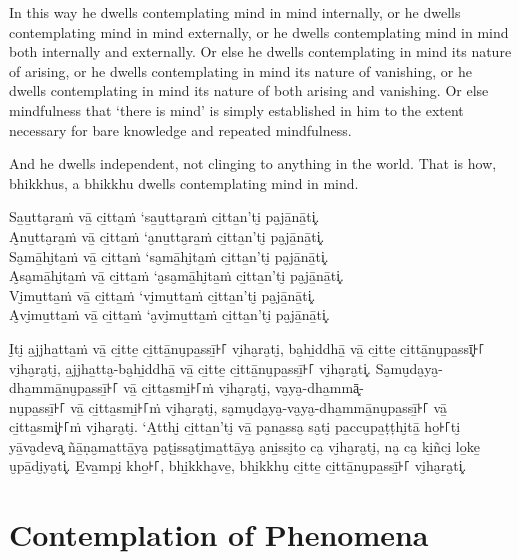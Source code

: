 In this way he dwells contemplating mind in mind internally, or he dwells
contemplating mind in mind externally, or he dwells contemplating mind in mind
both internally and externally. Or else he dwells contemplating in mind its
nature of arising, or he dwells contemplating in mind its nature of vanishing,
or he dwells contemplating in mind its nature of both arising and vanishing. Or
else mindfulness that ‘there is mind’ is simply established in him to the extent
necessary for bare knowledge and repeated mindfulness.

And he dwells independent, not clinging to anything in the world. That is how,
bhikkhus, a bhikkhu dwells contemplating mind in mind.


\paliPage

Sa̱u̱tta̮ra̱ṁ vā̱ ci̱tta̱ṁ ‘sa̱u̱tta̮ra̱ṁ ci̱tta̱n’ti̮ pa̮jā̱nā̱ti͓.\\
A̮nu̱tta̮ra̱ṁ vā̱ ci̱tta̱ṁ ‘a̮nu̱tta̮ra̱ṁ ci̱tta̱n’ti̮ pa̮jā̱nā̱ti͓.\\
Sa̮mā̱hi̮ta̱ṁ vā̱ ci̱tta̱ṁ ‘sa̮mā̱hi̮ta̱ṁ ci̱tta̱n’ti̮ pa̮jā̱nā̱ti͓.\\
A̮sa̮mā̱hi̮ta̱ṁ vā̱ ci̱tta̱ṁ ‘a̮sa̮mā̱hi̮ta̱ṁ ci̱tta̱n’ti̮ pa̮jā̱nā̱ti͓.\\
Vi̮mu̱tta̱ṁ vā̱ ci̱tta̱ṁ ‘vi̮mu̱tta̱ṁ ci̱tta̱n’ti̮ pa̮jā̱nā̱ti͓.\\
A̮vi̮mu̱tta̱ṁ vā̱ ci̱tta̱ṁ ‘a̮vi̮mu̱tta̱ṁ ci̱tta̱n’ti̮ pa̮jā̱nā̱ti͓.

I̮ti̮ a̱jjha̱tta̱ṁ vā̱ ci̱tte̱ ci̱ttā̱nu̮pa̱ssī̱꜔꜒ vi̮ha̮ra̮ti̮, ba̮hi̱ddhā̱ vā̱ ci̱tte̱ ci̱ttā̱nu̮pa̱ssī͓꜔꜒
vi̮ha̮ra̮ti̮, a̱jjha̱tta̮-ba̮hi̱ddhā̱ vā̱ ci̱tte̱ ci̱ttā̱nu̮pa̱ssī̱꜔꜒ vi̮ha̮ra̮ti͓.
Sa̮mu̮da̮ya̮-dha̱mmā̱nu̮pa̱ssī̱꜔꜒ vā̱ ci̱tta̱smi̱꜔꜒ṁ vi̮ha̮ra̮ti̮, va̮ya̮-dha̱mmā͓-\\
nu̮pa̱ssī̱꜔꜒ vā̱ ci̱tta̱smi̱꜔꜒ṁ vi̮ha̮ra̮ti̮, sa̮mu̮da̮ya̮-va̮ya̮-dha̱mmā̱nu̮pa̱ssī̱꜔꜒ vā̱ ci̱tta̱smi͓꜔꜒ṁ
vi̮ha̮ra̮ti̮. ‘A̱tthi̮ ci̱tta̱n’ti̮ vā̱ pa̮na̱ssa̮ sa̮ti̮ pa̱ccu̮pa̱ṭṭhi̮tā̱ ho̱꜔꜒ti̮ yā̱va̮de̱va͓
ñā̱ṇa̮ma̱ttā̱ya̮ pa̮ṭi̱ssa̮ti̮ma̱ttā̱ya̮ a̮ni̱ssi̮to̱ ca̮ vi̮ha̮ra̮ti̮, na̮ ca̮ ki̱ñci̮ lo̱ke̱ u̮pā̱di̮ya̮ti͓.
E̱va̱mpi̮ kho̱꜔꜒, bhi̱kkha̮ve̱, bhi̱kkhu̮ ci̱tte̱ ci̱ttā̱nu̮pa̱ssī̱꜔꜒ vi̮ha̮ra̮ti͓.


\englishPage

\paliPage

\englishPage
\chapter{Contemplation of Phenomena}

